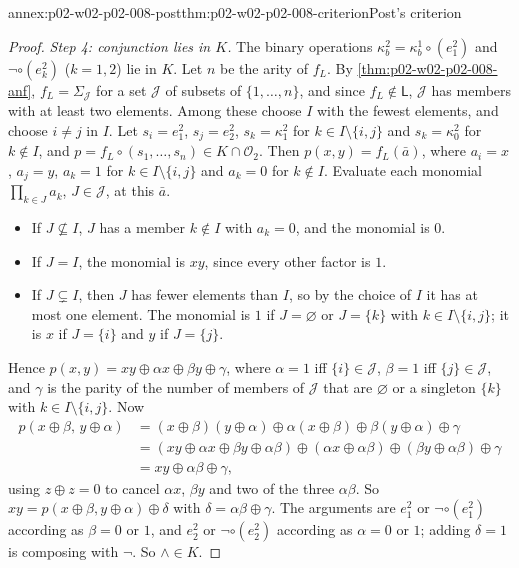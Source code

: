 \begin{annexitem}{annex:p02-w02-p02-008-post}{thm:p02-w02-p02-008-criterion}{Post's criterion}
\begin{proof}
\emph{Step 4: conjunction lies in \(K\).}  The binary operations
\(\kappa^2_b=\kappa^1_b\circ(e^2_1)\) and \(\neg\circ(e^2_k)\)
(\(k=1,2\)) lie in \(K\).  Let \(n\) be the arity of \(f_L\).  By
\cref{thm:p02-w02-p02-008-anf}, \(f_L=\Sigma_{\mathcal J}\) for a set
\(\mathcal J\) of subsets of \(\{1,\ldots,n\}\), and since
\(f_L\notin\mathsf L\), \(\mathcal J\) has members with at least two
elements.  Among these choose \(I\) with the fewest elements, and choose
\(i\neq j\) in \(I\).  Let \(s_i=e^2_1\), \(s_j=e^2_2\),
\(s_k=\kappa^2_1\) for \(k\in I\setminus\{i,j\}\) and \(s_k=\kappa^2_0\)
for \(k\notin I\), and \(p=f_L\circ(s_1,\ldots,s_n)\in K\cap\mathcal O_2\).
Then \(p(x,y)=f_L(\bar a)\), where \(a_i=x\), \(a_j=y\), \(a_k=1\) for
\(k\in I\setminus\{i,j\}\) and \(a_k=0\) for \(k\notin I\).  Evaluate each
monomial \(\prod_{k\in J}a_k\), \(J\in\mathcal J\), at this \(\bar a\).
\begin{itemize}
\item If \(J\not\subseteq I\), \(J\) has a member \(k\notin I\) with
  \(a_k=0\), and the monomial is \(0\).
\item If \(J=I\), the monomial is \(xy\), since every other factor is \(1\).
\item If \(J\subsetneq I\), then \(J\) has fewer elements than \(I\), so by
  the choice of \(I\) it has at most one element.  The monomial is \(1\) if
  \(J=\varnothing\) or \(J=\{k\}\) with \(k\in I\setminus\{i,j\}\); it is
  \(x\) if \(J=\{i\}\) and \(y\) if \(J=\{j\}\).
\end{itemize}
Hence \(p(x,y)=xy\oplus\alpha x\oplus\beta y\oplus\gamma\), where
\(\alpha=1\) iff \(\{i\}\in\mathcal J\), \(\beta=1\) iff
\(\{j\}\in\mathcal J\), and \(\gamma\) is the parity of the number of members
of \(\mathcal J\) that are \(\varnothing\) or a singleton \(\{k\}\) with
\(k\in I\setminus\{i,j\}\).  Now
\[
\begin{aligned}
 p(x\oplus\beta,\,y\oplus\alpha)
 &=(x\oplus\beta)(y\oplus\alpha)\oplus\alpha(x\oplus\beta)\oplus
   \beta(y\oplus\alpha)\oplus\gamma\\
 &=(xy\oplus\alpha x\oplus\beta y\oplus\alpha\beta)\oplus
   (\alpha x\oplus\alpha\beta)\oplus(\beta y\oplus\alpha\beta)\oplus\gamma\\
 &=xy\oplus\alpha\beta\oplus\gamma,
\end{aligned}
\]
using \(z\oplus z=0\) to cancel \(\alpha x\), \(\beta y\) and two of the three
\(\alpha\beta\).  So \(xy=p(x\oplus\beta,y\oplus\alpha)\oplus\delta\) with
\(\delta=\alpha\beta\oplus\gamma\).  The arguments are \(e^2_1\) or
\(\neg\circ(e^2_1)\) according as \(\beta=0\) or \(1\), and \(e^2_2\) or
\(\neg\circ(e^2_2)\) according as \(\alpha=0\) or \(1\); adding
\(\delta=1\) is composing with \(\neg\).  So \(\land\in K\).


\end{proof}
\end{annexitem}
